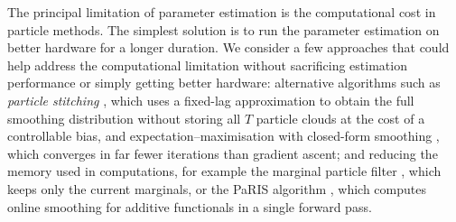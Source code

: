 The principal limitation of parameter estimation is the computational cost in particle methods. The simplest solution is to run the parameter estimation on better hardware for a longer duration. We consider a few approaches that could help address the computational limitation without sacrificing estimation performance or simply getting better hardware: alternative algorithms such as \textit{particle stitching} \citep{duffieldsingh2022onlinesmoothing}, which uses a fixed-lag approximation to obtain the full smoothing distribution without storing all $T$ particle clouds at the cost of a controllable bias, and expectation--maximisation with closed-form smoothing \citep{duffieldpowerrimella2024factorialssm}, which converges in far fewer iterations than gradient ascent; and reducing the memory used in computations, for example the marginal particle filter \citep{klaasdefreitasdoucet2005marginalpf}, which keeps only the current marginals, or the PaRIS algorithm \citep{olssonwesterborn2017paris}, which computes online smoothing for additive functionals in a single forward pass.